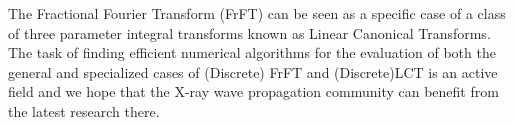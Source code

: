 \documentclass{iucr}              %
\newcommand{\todo}[1]{{\color{red}[TODO: "#1'']}}
\begin{document}
The Fractional Fourier Transform (FrFT) can be seen as a specific case of a class of three parameter integral transforms known as Linear Canonical Transforms\cite{Hennelly05}. The task of finding efficient numerical algorithms for the evaluation of both the general and specialized cases of (Discrete) FrFT and (Discrete)LCT is an active field \cite{BULTHEEL2004182,Koç2016} and we hope that the X-ray wave propagation community can benefit from the latest research there.


% 
% 
% 
\end{document}
